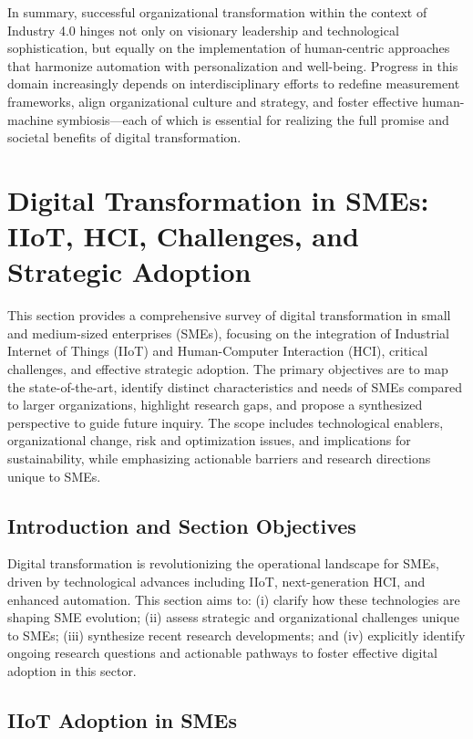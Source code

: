 \documentclass[sigconf]{acmart}
\begin{document}
In summary, successful organizational transformation within the context of Industry 4.0 hinges not only on visionary leadership and technological sophistication, but equally on the implementation of human-centric approaches that harmonize automation with personalization and well-being. Progress in this domain increasingly depends on interdisciplinary efforts to redefine measurement frameworks, align organizational culture and strategy, and foster effective human-machine symbiosis—each of which is essential for realizing the full promise and societal benefits of digital transformation.

\section{Digital Transformation in SMEs: IIoT, HCI, Challenges, and Strategic Adoption}

This section provides a comprehensive survey of digital transformation in small and medium-sized enterprises (SMEs), focusing on the integration of Industrial Internet of Things (IIoT) and Human-Computer Interaction (HCI), critical challenges, and effective strategic adoption. The primary objectives are to map the state-of-the-art, identify distinct characteristics and needs of SMEs compared to larger organizations, highlight research gaps, and propose a synthesized perspective to guide future inquiry. The scope includes technological enablers, organizational change, risk and optimization issues, and implications for sustainability, while emphasizing actionable barriers and research directions unique to SMEs.

\subsection{Introduction and Section Objectives}

Digital transformation is revolutionizing the operational landscape for SMEs, driven by technological advances including IIoT, next-generation HCI, and enhanced automation. This section aims to: (i) clarify how these technologies are shaping SME evolution; (ii) assess strategic and organizational challenges unique to SMEs; (iii) synthesize recent research developments; and (iv) explicitly identify ongoing research questions and actionable pathways to foster effective digital adoption in this sector.

\subsection{IIoT Adoption in SMEs}
\end{document}
